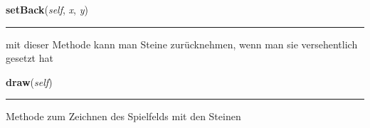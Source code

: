     \label{Main:main:mainGUI:setBack}

    \vspace{0.5ex}

\hspace{.8\funcindent}\begin{boxedminipage}{\funcwidth}

    \raggedright \textbf{setBack}(\textit{self}, \textit{x}, \textit{y})

    \vspace{-1.5ex}

    \rule{\textwidth}{0.5\fboxrule}
\setlength{\parskip}{2ex}
    mit dieser Methode kann man Steine zurücknehmen, wenn man sie 
    versehentlich gesetzt hat

\setlength{\parskip}{1ex}
    \end{boxedminipage}

    \label{Main:main:mainGUI:draw}

    \vspace{0.5ex}

\hspace{.8\funcindent}\begin{boxedminipage}{\funcwidth}

    \raggedright \textbf{draw}(\textit{self})

    \vspace{-1.5ex}

    \rule{\textwidth}{0.5\fboxrule}
\setlength{\parskip}{2ex}
    Methode zum Zeichnen des Spielfelds mit den Steinen

\setlength{\parskip}{1ex}
    \end{boxedminipage}

    \label{Main:main:mainGUI:zug_speichern}

    \vspace{0.5ex}

